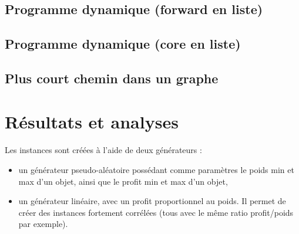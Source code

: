 \documentclass[12pt]{article}
\begin{document}
\paragraph{}

\subsection{Programme dynamique (forward en liste)}

\paragraph{}

\subsection{Programme dynamique (core en liste)}

\paragraph{}

\subsection{Plus court chemin dans un graphe}

\paragraph{}

\section{Résultats et analyses}

\paragraph{}Les instances sont créées à l'aide de deux générateurs :
\begin{itemize}
\item un générateur pseudo-aléatoire possédant comme paramètres le poids min et max d'un objet, ainsi que le profit min et max d'un objet,
\item un générateur linéaire, avec un profit proportionnel au poids. Il permet de créer des instances fortement corrélées (tous avec le même ratio profit/poids par exemple).
\end{itemize}
\end{document}
